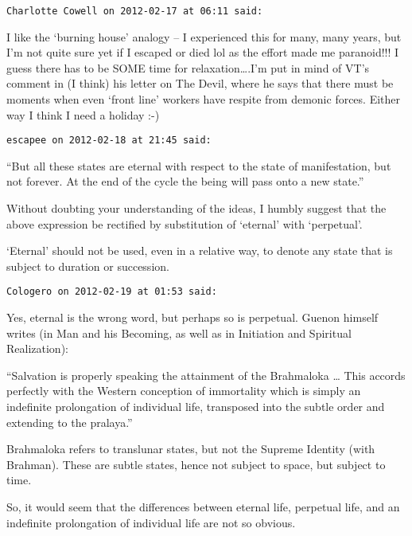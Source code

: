 \begin{footnotesize}\begin{sffamily}

\texttt{Charlotte Cowell on 2012-02-17 at 06:11 said: }

I like the `burning house' analogy – I experienced this for many, many years, but I'm not quite sure yet if I escaped or died lol as the effort made me paranoid!!! I guess there has to be SOME time for relaxation….I'm put in mind of VT's comment in (I think) his letter on The Devil, where he says that there must be moments when even `front line' workers have respite from demonic forces. Either way I think I need a holiday :-)


\hfill

\texttt{escapee on 2012-02-18 at 21:45 said: }

“But all these states are eternal with respect to the state of manifestation, but not forever. At the end of the cycle the being will pass onto a new state.”

Without doubting your understanding of the ideas, I humbly suggest that the above expression be rectified by substitution of `eternal' with `perpetual'. 

`Eternal' should not be used, even in a relative way, to denote any state that is subject to duration or succession.


\hfill

\texttt{Cologero on 2012-02-19 at 01:53 said: }

Yes, eternal is the wrong word, but perhaps so is perpetual. Guenon himself writes (in Man and his Becoming, as well as in Initiation and Spiritual Realization):

“Salvation is properly speaking the attainment of the Brahmaloka … This accords perfectly with the Western conception of immortality which is simply an indefinite prolongation of individual life, transposed into the subtle order and extending to the pralaya.”

Brahmaloka refers to translunar states, but not the Supreme Identity (with Brahman). These are subtle states, hence not subject to space, but subject to time.

So, it would seem that the differences between eternal life, perpetual life, and an indefinite prolongation of individual life are not so obvious.

\hfill
\end{sffamily}\end{footnotesize}
